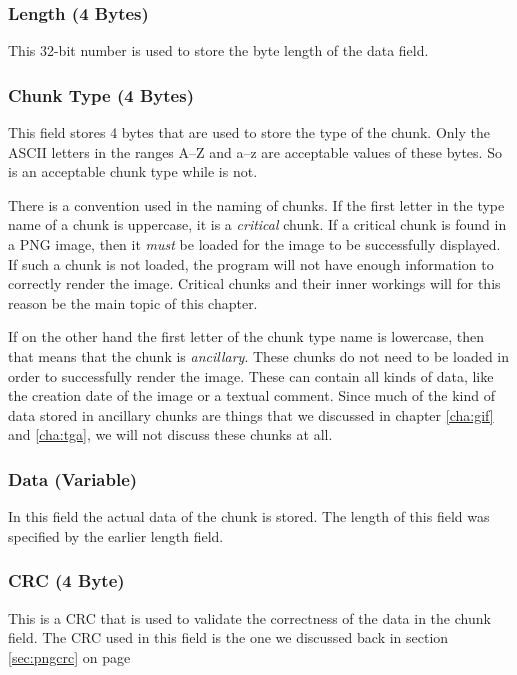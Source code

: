 \subsubsection*{Length (4 Bytes)}

This 32-bit number is used to store the byte length of the data
field.

\subsubsection*{Chunk Type (4 Bytes)}

This field stores 4 bytes that are used to store the type of the
chunk. Only the ASCII letters in the ranges A--Z and a--z are
acceptable values of these bytes. So  is an acceptable
chunk type while  is not.

There is a convention used in the naming of chunks. If the first
letter in the type name of a chunk is uppercase, it is a
\textit{critical} chunk. If a critical chunk is found in a PNG image,
then it \textit{must} be loaded for the image to be successfully
displayed.  If such a chunk is not loaded, the program will not have
enough information to correctly render the image. Critical chunks and
their inner workings will for this reason be the main topic of this
chapter.

If on the other hand the first letter of the chunk type name is
lowercase, then that means that the chunk is \textit{ancillary}. These
chunks do not need to be loaded in order to successfully render the
image. These can contain all kinds of data, like the creation date of
the image or a textual comment. Since much of the kind of data stored
in ancillary chunks are things that we discussed in chapter
\ref{cha:gif} and \ref{cha:tga}, we will not discuss these chunks at
all.

\subsubsection*{Data (Variable)}

In this field the actual data of the chunk is stored. The length of
this field was specified by the earlier length field.

\subsubsection*{CRC (4 Byte)}

This is a CRC that is used to validate the correctness of the data in
the chunk field. The CRC used in this field is the one we discussed
back in section \ref{sec:pngcrc} on page \pageref{sec:pngcrc}

